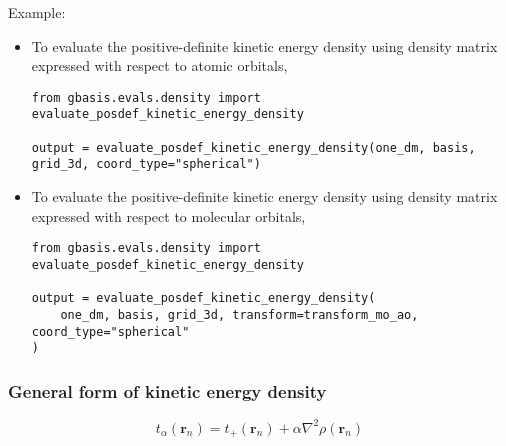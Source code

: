 \documentclass[letterpaper]{article}
\begin{document}
Example:
\begin{itemize}
\item To evaluate the positive-definite kinetic energy density using density
  matrix expressed with respect to atomic orbitals,
  \begin{lstlisting}[xleftmargin=-25pt]
from gbasis.evals.density import evaluate_posdef_kinetic_energy_density

output = evaluate_posdef_kinetic_energy_density(one_dm, basis, grid_3d, coord_type="spherical")
\end{lstlisting}
\item To evaluate the positive-definite kinetic energy density using density
  matrix expressed with respect to molecular orbitals,
  \begin{lstlisting}[xleftmargin=-25pt]
from gbasis.evals.density import evaluate_posdef_kinetic_energy_density

output = evaluate_posdef_kinetic_energy_density(
    one_dm, basis, grid_3d, transform=transform_mo_ao, coord_type="spherical"
)
\end{lstlisting}
\end{itemize}
\subsubsection{General form of kinetic energy density}
\begin{equation}
  t_{\alpha} (\mathbf{r}_n) = t_+(\mathbf{r}_n) + \alpha \nabla^2 \rho(\mathbf{r}_n)
\end{equation}
\end{document}
